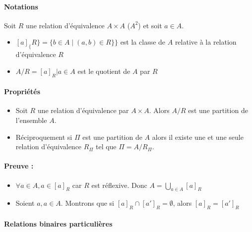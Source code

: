 \documentclass[12pt, a4paper]{report}
\begin{document}


\paragraph{Notations}

Soit $R$ une relation d'équivalence $A \times A$ ($A^{2}$) et soit $a
\in A$.

\begin{itemize}

\item $[a]_\{R\} = \{ b \in A \mid (a,b) \in R\} \}$ est la classe de $A$
relative à la relation d'équivalence $R$

\item $A/R = {[a]_{R} | a \in A}$ est le quotient de $A$ par $R$
\end{itemize}

\paragraph{Propriétés}

\begin{itemize}

\item Soit $R$ une relation d'équivalence par $A \times A$. Alors
  $A/R$ est une partition de l'ensemble $A$.

\item Réciproquement si $\Pi$ est une partition de $A$ alors il existe
  une et une seule relation d'équivalence $R_{\Pi}$ tel que $\Pi =
  A/R_{\Pi}$.

\end{itemize}

\paragraph{Preuve :}
\begin{itemize}

\item $\forall a\in A, a\in [a]_R$ car $R$ est réflexive. Donc $A =
  \bigcup_{a\in A}[a]_R$

\item Soient $a, a\in A$. Montrons que si $[a]_R\cap [a']_R
  =\emptyset$, alors $[a]_R=[a']_R$
\end{itemize}

\paragraph{Relations binaires particulières}
\end{document}
